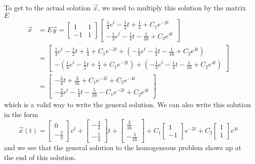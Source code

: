 \begin{exampleSol}
To get to the actual solution $\vec{x}$, we need to multiply this solution by the matrix $E$
\begin{equation*}
\begin{split}
\vec{x} &= E\vec{y} = \begin{bmatrix} 1 & 1 \\ -1 & 1 \end{bmatrix} \begin{bmatrix} 
\frac{1}{3}e^t - \frac{1}{2} t + \frac{1}{4} + C_1e^{-2t} \\
-\frac{1}{3}e^{t} - \frac{1}{4}t - \frac{1}{16} + C_2e^{4t}
\end{bmatrix} \\
&= \begin{bmatrix}\frac{1}{3}e^t - \frac{1}{2} t + \frac{1}{4} + C_1e^{-2t} + (-\frac{1}{3}e^{t} - \frac{1}{4}t - \frac{1}{16} + C_2e^{4t}) \\
-(\frac{1}{3}e^t - \frac{1}{2} t + \frac{1}{4} + C_1e^{-2t}) + (-\frac{1}{3}e^{t} - \frac{1}{4}t - \frac{1}{16} + C_2e^{4t}) \end{bmatrix} \\
&= \begin{bmatrix} -\frac{3}{4}t + \frac{3}{16} + C_1e^{-2t} + C_2e^{-4t} \\ -\frac{2}{3}e^{t} - \frac{1}{4}t - \frac{5}{16} - C_1e^{-2t} + C_2e^{4t} \end{bmatrix}
\end{split}
\end{equation*}
which is a valid way to write the general solution. We can also write this solution in the form
\begin{equation*}
\vec{x}(t) = \begin{bmatrix} 0 \\ -\frac{2}{3} \end{bmatrix} e^t + \begin{bmatrix} -\frac{3}{4} \\ -\frac{1}{4} \end{bmatrix} t + \begin{bmatrix} \frac{3}{16} \\ -\frac{5}{16} \end{bmatrix} + C_1\begin{bmatrix} 1 \\ -1 \end{bmatrix}e^{-2t} + C_2\begin{bmatrix} 1 \\ 1 \end{bmatrix} e^{4t}
\end{equation*}
and we see that the general solution to the homogeneous problem shows up at the end of this solution.


\end{exampleSol}
